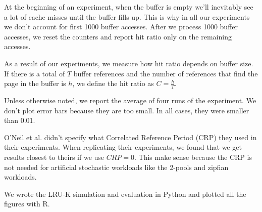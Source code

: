 At the beginning of an experiment, when the buffer is empty we'll inevitably see a lot of cache misses until the buffer fills up. This is why in all our experiments we don't account for first 1000 buffer accesses. After we process 1000 buffer accesses, we reset the counters and report hit ratio only on the remaining accesses.

As a result of our experiments, we measure how hit ratio depends on buffer size. If there is a total of $T$ buffer references and the number of references that find the page in the buffer is $h$, we define the hit ratio as $C = \frac{h}{T}$.

Unless otherwise noted, we report the average of four runs of the experiment. We don't plot error bars because they are too small. In all cases, they were smaller than 0.01.

O'Neil et al. \cite{lruk} didn't specify what Correlated Reference Period (CRP) they used in their experiments. When replicating their experiments, we found that we get results closest to theirs if we use $CRP = 0$. This make sense because the CRP is not needed for artificial stochastic workloads like the 2-pools and zipfian workloads.

We wrote the LRU-K simulation and evaluation in Python and plotted all the figures with R.